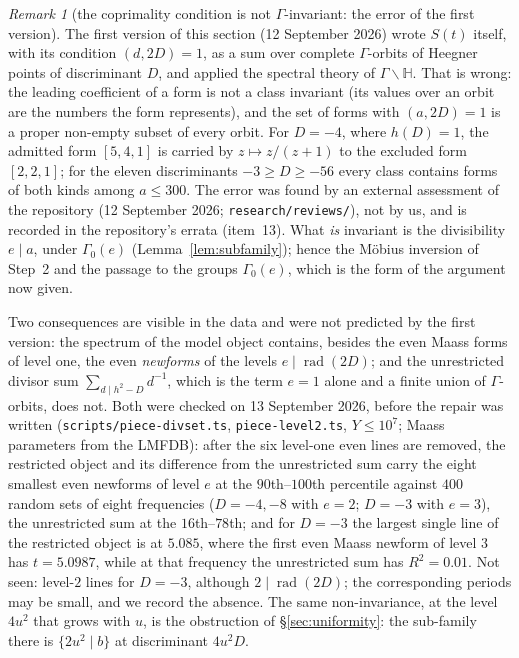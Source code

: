 \documentclass[11pt,a4paper]{article}
\theoremstyle{remark}\newtheorem{remark}[theorem]{Remark}
\begin{document}
\begin{remark}[the coprimality condition is not $\Gamma$-invariant: the error of the first version]\label{rem:coprime}
The first version of this section (12 September 2026) wrote $S(t)$ itself, with its condition $(d,2D)=1$, as a sum over
complete $\Gamma$-orbits of Heegner points of discriminant $D$, and applied the spectral theory of
$\Gamma\backslash\mathbb H$. That is wrong: the leading coefficient of a form is not a class invariant (its values over
an orbit are the numbers the form represents), and the set of forms with $(a,2D)=1$ is a proper non-empty subset of
every orbit. For $D=-4$, where $h(D)=1$, the admitted form $[5,4,1]$ is carried by $z\mapsto z/(z+1)$ to the excluded
form $[2,2,1]$; for the eleven discriminants $-3\ge D\ge-56$ every class contains forms of both kinds among $a\le300$.
The error was found by an external assessment of the repository (12 September 2026; \texttt{research/reviews/}), not
by us, and is recorded in the repository's errata (item~13). What \emph{is} invariant is the divisibility $e\mid a$,
under $\Gamma_0(e)$ (Lemma~\ref{lem:subfamily}); hence the M\"obius inversion of Step~2 and the passage to the groups
$\Gamma_0(e)$, which is the form of the argument now given.

Two consequences are visible in the data and were not predicted by the first version: the spectrum of the model
object contains, besides the even Maass forms of level one, the even \emph{newforms} of the levels
$e\mid\operatorname{rad}(2D)$; and the unrestricted divisor sum $\sum_{d\mid h^2-D}d^{-1}$, which is the term $e=1$
alone and a finite union of $\Gamma$-orbits, does not. Both were checked on 13 September 2026, before the repair was
written (\texttt{scripts/piece-divset.ts}, \texttt{piece-level2.ts}, $Y\le10^7$; Maass parameters from the LMFDB):
after the six level-one even lines are removed, the restricted object and its difference from the unrestricted sum
carry the eight smallest even newforms of level $e$ at the $90$th--$100$th percentile against $400$ random sets of
eight frequencies ($D=-4,-8$ with $e=2$; $D=-3$ with $e=3$), the unrestricted sum at the $16$th--$78$th; and for
$D=-3$ the largest single line of the restricted object is at $5.085$, where the first even Maass newform of level $3$
has $t=5.0987$, while at that frequency the unrestricted sum has $R^2=0.01$. Not seen: level-$2$ lines for $D=-3$,
although $2\mid\operatorname{rad}(2D)$; the corresponding periods may be small, and we record the absence. The same
non-invariance, at the level $4u^2$ that grows with $u$, is the obstruction of \S\ref{sec:uniformity}: the sub-family
there is $\{2u^2\mid b\}$ at discriminant $4u^2D$.
\end{remark}
\end{document}
